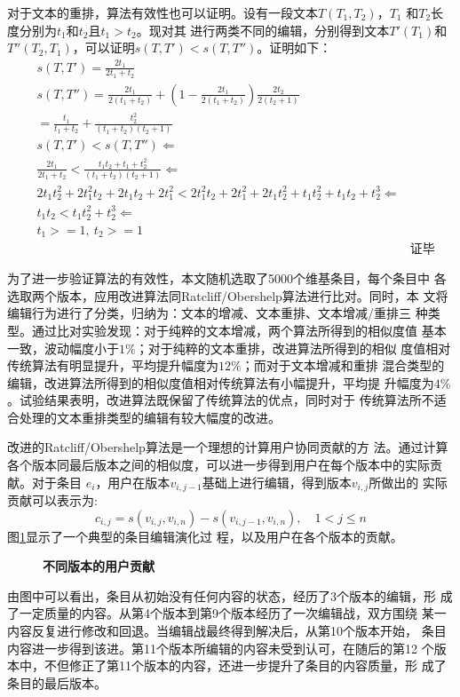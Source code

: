 对于文本的重排，算法有效性也可以证明。设有一段文本$T(T_1,T_2)$，$T_1$
和$T_2$长度分别为$t_1$和$t_2$且$t_1>t_2$。现对其
进行两类不同的编辑，分别得到文本$T'(T_1)$和$T''(T_2,T_1)$，可以证明$s(T,T')<s(T,T'')$。证明如下：
\begin{eqnarray*}
  \label{eq:3}
&s(T,T')=\frac{2t_1}{2t_1+t_2}& \\
&s(T,T'')=\frac{2t_1}{2(t_1+t_2)}+(1-\frac{2t_1}{2(t_1+t_2)})\frac{2t_2}{2(t_2+1)}&\\
         &=\frac{t_1}{t_1+t_2}+\frac{t_2^2}{(t_1+t_2)(t_2+1)}& \\
&s(T,T')<s(T,T'') \Leftarrow&   \\
&\frac{2t_1}{2t_1+t_2}<\frac{t_1t_2+t_1+t_2^2}{(t_1+t_2)(t_2+1)} \Leftarrow& \\
&2t_1t_2^2+2t_1^2t_2+2t_1t_2+2t_1^2<2t_1^2t_2+2t_1^2+2t_1t_2^2+t_1t_2^2+t_1t_2+t_2^3
\Leftarrow & \\
&t_1t_2<t_1t_2^2+t_2^3  \Leftarrow& \\
& t_1>=1, \ t_2>=1& \\
&&\text{证毕}
\end{eqnarray*}

为了进一步验证算法的有效性，本文随机选取了5000个维基条目，每个条目中
各选取两个版本，应用改进算法同Ratcliff/Obershelp算法进行比对。同时，本
文将编辑行为进行了分类，归纳为：文本的增减、文本重排、文本增减/重排三
种类型。通过比对实验发现：对于纯粹的文本增减，两个算法所得到的相似度值
基本一致，波动幅度小于$1\%$；对于纯粹的文本重排，改进算法所得到的相似
度值相对传统算法有明显提升，平均提升幅度为$12\%$；而对于文本增减和重排
混合类型的编辑，改进算法所得到的相似度值相对传统算法有小幅提升，平均提
升幅度为$4\%$。试验结果表明，改进算法既保留了传统算法的优点，同时对于
传统算法所不适合处理的文本重排类型的编辑有较大幅度的改进。

改进的Ratcliff/Obershelp算法是一个理想的计算用户协同贡献的方
法。通过计算
各个版本同最后版本之间的相似度，可以进一步得到用户在每个版本中的实际贡献。对于条目
$e_i$，用户在版本$v_{i,j-1}$基础上进行编辑，得到版本$v_{i,j}$所做出的
实际贡献可以表示为:
\[
c_{i,j}=s(v_{i,j},v_{i,n})-s(v_{i,j-1},v_{i,n}), \quad 1<j \leq n
\]
图\ref{fig:contribution}显示了一个典型的条目编辑演化过
程，以及用户在各个版本的贡献。
\begin{figure}[htp]
  \centering
 
  \caption{\small{\bf{不同版本的用户贡献}}}
  \label{fig:contribution}
\end{figure}

由图中可以看出，条目从初始没有任何内容的状态，经历了3个版本的编辑，形
成了一定质量的内容。从第4个版本到第9个版本经历了一次编辑战，双方围绕
某一内容反复进行修改和回退。当编辑战最终得到解决后，从第10个版本开始，
条目内容进一步得到该进。第11个版本所编辑的内容未受到认可，在随后的第12
个版本中，不但修正了第11个版本的内容，还进一步提升了条目的内容质量，形
成了条目的最后版本。


